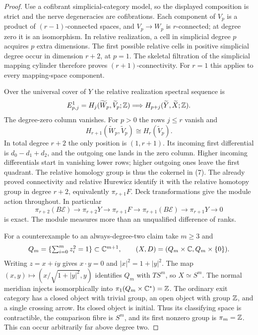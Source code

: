 \begin{proof}
Use a cofibrant simplicial-category model,
so the displayed composition is strict and
the nerve degeneracies are cofibrations.
Each component of $V_p$ is a product of
$(r-1)$-connected spaces, and $V_p\to W_p$
is $r$-connected; at degree zero it is an
isomorphism. In relative realization,
a cell in simplicial degree $p$ acquires
$p$ extra dimensions. The first possible
relative cells in positive simplicial
degree occur in dimension $r+2$, at $p=1$.
The skeletal filtration of the simplicial
mapping cylinder therefore proves
$(r+1)$-connectivity. For $r=1$ this
applies to every mapping-space component.

Over the universal cover of $Y$ the relative
realization spectral sequence is
\[
 E^1_{p,j}=H_j(\widetilde W_p,\widetilde V_p;\mathbb Z)
 \Longrightarrow H_{p+j}(\widetilde Y,\widetilde X;\mathbb Z).
\]
The degree-zero column vanishes.
For $p>0$ the rows $j\le r$ vanish and
\[
 H_{r+1}(\widetilde W_p,\widetilde V_p)
       \cong H_r(\widetilde V_p).
\]
In total degree $r+2$ the only position
is $(1,r+1)$. Its incoming first
differential is $d_0-d_1+d_2$, and the
outgoing one lands in the zero column.
Higher incoming differentials start
in vanishing lower rows; higher
outgoing ones leave the first quadrant.
The relative homology group is thus
the cokernel in (7).
The already proved connectivity and
relative Hurewicz identify it with
the relative homotopy group in
degree $r+2$, equivalently $\pi_{r+1}F$.
Deck transformations give the module
action throughout. In particular
\[
 \pi_{r+2}(B\mathcal E)\to\pi_{r+2}Y
 \to\pi_{r+1}F\to\pi_{r+1}(B\mathcal E)
 \to\pi_{r+1}Y\to0
\]
is exact. The module measures more
than an unqualified difference of ranks.

For a counterexample to an always-degree-two
claim take $m\ge3$ and
\[
 Q_m=\{\textstyle\sum_{i=0}^m z_i^2=1\}\subset\mathbb C^{m+1},
 \qquad (X,D)=(Q_m\times\mathbb C,Q_m\times\{0\}).
\]
Writing $z=x+iy$ gives $x\cdot y=0$ and
$|x|^2=1+|y|^2$. The map
$(x,y)\mapsto(x/\sqrt{1+|y|^2},y)$
identifies $Q_m$ with $TS^m$, so
$X\simeq S^m$. The normal meridian
injects isomorphically into
$\pi_1(Q_m\times\mathbb C^*)=\mathbb Z$.
The ordinary exit category has a
closed object with trivial group,
an open object with group $\mathbb Z$,
and a single crossing arrow.
Its closed object is initial.
Thus its classifying space is
contractible, the comparison fibre
is $S^m$, and its first nonzero
group is $\pi_m=\mathbb Z$.
This can occur arbitrarily far
above degree two.
\end{proof}

